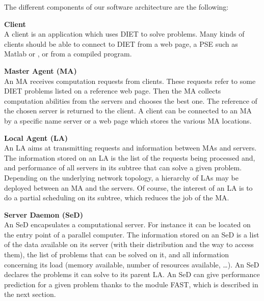 The different components of our software architecture are the following:      

\begin{description}
\item \textbf{Client}\\
  A client is an application which uses DIET to solve problems.  Many kinds
  of clients should be able to connect to DIET from a web page, a PSE such as
  Matlab or \sci, or from a compiled program.
\item \textbf{Master Agent (MA)}\\
  An MA receives computation requests from clients. These requests refer to some
  DIET problems listed on a reference web page. Then the MA collects computation
  abilities from the servers and chooses the best one. The reference of the
  chosen server is returned to the client. A client can be connected to an MA by
  a specific name server or a web page which stores the various MA locations.

\item \textbf{Local Agent (LA)}\\
  An LA aims at transmitting requests and information between MAs and servers.
  The information stored on an LA is the list of the requests being processed
  and, and performance of all servers in its subtree that can solve a given
  problem. Depending on the underlying network topology, a hierarchy of LAs may
  be deployed between an MA and the servers. Of course, the interest of an LA is
  to do a partial scheduling on its subtree, which reduces the job of the MA.

\item \textbf{Server Daemon (SeD)}\\
  An SeD encapsulates a computational server. For instance it can be located on
  the entry point of a parallel computer. The information stored on an SeD is a
  list of the data available on its server (with their distribution and the way
  to access them), the list of problems that can be solved on it, and all
  information concerning its load (memory available, number of resources
  available, \ldots). An SeD declares the problems it can solve to its parent LA.
  An SeD can give performance prediction for a given problem thanks to the
  module FAST, which is described in the next section.

\end{description}

